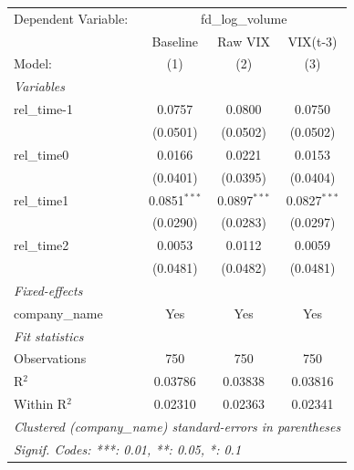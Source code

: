 
\begingroup
\centering
\begin{tabular}{lccc}
   \tabularnewline \midrule \midrule
   Dependent Variable: & \multicolumn{3}{c}{fd\_log\_volume}\\
                  & Baseline       & Raw VIX        & VIX(t-3) \\   
   Model:         & (1)            & (2)            & (3)\\  
   \midrule
   \emph{Variables}\\
   rel\_time-1    & 0.0757         & 0.0800         & 0.0750\\   
                  & (0.0501)       & (0.0502)       & (0.0502)\\   
   rel\_time0     & 0.0166         & 0.0221         & 0.0153\\   
                  & (0.0401)       & (0.0395)       & (0.0404)\\   
   rel\_time1     & 0.0851$^{***}$ & 0.0897$^{***}$ & 0.0827$^{***}$\\   
                  & (0.0290)       & (0.0283)       & (0.0297)\\   
   rel\_time2     & 0.0053         & 0.0112         & 0.0059\\   
                  & (0.0481)       & (0.0482)       & (0.0481)\\   
   \midrule
   \emph{Fixed-effects}\\
   company\_name  & Yes            & Yes            & Yes\\  
   \midrule
   \emph{Fit statistics}\\
   Observations   & 750            & 750            & 750\\  
   R$^2$          & 0.03786        & 0.03838        & 0.03816\\  
   Within R$^2$   & 0.02310        & 0.02363        & 0.02341\\  
   \midrule \midrule
   \multicolumn{4}{l}{\emph{Clustered (company\_name) standard-errors in parentheses}}\\
   \multicolumn{4}{l}{\emph{Signif. Codes: ***: 0.01, **: 0.05, *: 0.1}}\\
\end{tabular}
\par\endgroup


